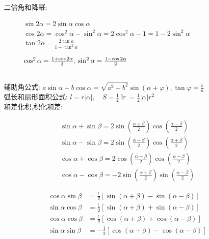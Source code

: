 \documentclass[hyperref, UTF8,11pt,a4paper]{ctexart} %
\begin{document}
\\
二倍角和降幂:
\begin{figure}[!h] %
	\centering
	\begin{minipage}{270pt}
		$\sin 2 \alpha=2 \sin \alpha \cos \alpha$ \\
		$\cos 2 \alpha=\cos ^{2} \alpha-\sin ^{2} \alpha=2 \cos ^{2} \alpha-1=1-2 \sin ^{2} \alpha$ \\
		$\tan 2 \alpha=\frac{2 \tan \alpha}{1-\tan ^{2} \alpha}$
	\end{minipage}
	\hspace{10pt}
	\begin{minipage}{170pt}
		$\cos ^{2} \alpha=\frac{1+\cos 2 \alpha}{2}, \\ \sin ^{2} \alpha=\frac{1-\cos 2 \alpha}{2}$
	\end{minipage}
\end{figure}
\\
辅助角公式: \quad
$a \sin \alpha+b \cos \alpha=\sqrt{a^{2}+b^{2}} \sin (\alpha+\varphi), \tan \varphi=\frac{b}{a}$ \\
弧长和扇形面积公式: \quad
$l=r|\alpha|, \quad S=\frac{1}{2} \operatorname{lr}=\frac{1}{2}|\alpha| r^{2}$ \\
和差化积,积化和差:
\begin{figure}[!h] %
	\centering
	\begin{minipage}{200pt}
		$$
			\begin{array}{l}{\sin \alpha+\sin \beta=2 \sin \left(\frac{\alpha+\beta}{2}\right) \cos \left(\frac{\alpha-\beta}{2}\right)} \\ {\sin \alpha-\sin \beta=2 \sin \left(\frac{\alpha-\beta}{2}\right) \cos \left(\frac{\alpha+\beta}{2}\right)} \\ {\cos \alpha+\cos \beta=2 \cos \left(\frac{\alpha+\beta}{2}\right) \cos \left(\frac{\alpha-\beta}{2}\right)} \\ {\cos \alpha-\cos \beta=-2 \sin \left(\frac{\alpha+\beta}{2}\right) \sin \left(\frac{\alpha-\beta}{2}\right)}\end{array}
		$$
	\end{minipage}
	\hspace{10pt}
	\begin{minipage}{200pt}
		$$
			\begin{aligned} \cos \alpha \sin \beta &=\frac{1}{2}[\sin (\alpha+\beta)-\sin (\alpha-\beta)] \\ \sin \alpha \cos \beta &=\frac{1}{2}[\sin (\alpha+\beta)+\sin (\alpha-\beta)] \\ \cos \alpha \cos \beta &=\frac{1}{2}[\cos (\alpha+\beta)+\cos (\alpha-\beta)] \\ \sin \alpha \sin \beta &=-\frac{1}{2}[\cos (\alpha+\beta)-\cos (\alpha-\beta)] \end{aligned}
		$$
	\end{minipage}
\end{figure} \\
\end{document}
